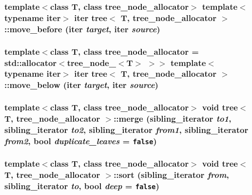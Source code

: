 \hypertarget{classtree_b45aa15042445a81b13873d3ef4a2e86}{
\subsubsection{\setlength{\rightskip}{0pt plus 5cm}template$<$class T, class tree\_\-node\_\-allocator$>$ template$<$typename iter$>$ iter {\bf tree}$<$ T, tree\_\-node\_\-allocator $>$::move\_\-before (iter {\em target}, \/  iter {\em source})}}
\label{classtree_b45aa15042445a81b13873d3ef4a2e86}


\hypertarget{classtree_d9502fe76187e35ef0dcd0a46a39193b}{
\subsubsection{\setlength{\rightskip}{0pt plus 5cm}template$<$class T, class tree\_\-node\_\-allocator = std::allocator$<$tree\_\-node\_\-$<$T$>$ $>$$>$ template$<$typename iter$>$ iter {\bf tree}$<$ T, tree\_\-node\_\-allocator $>$::move\_\-below (iter {\em target}, \/  iter {\em source})}}
\label{classtree_d9502fe76187e35ef0dcd0a46a39193b}


\hypertarget{classtree_1e3cd901f8f8d8a3da0e1d32e9282db1}{
\subsubsection{\setlength{\rightskip}{0pt plus 5cm}template$<$class T, class tree\_\-node\_\-allocator$>$ void {\bf tree}$<$ T, tree\_\-node\_\-allocator $>$::merge ({\bf sibling\_\-iterator} {\em to1}, \/  {\bf sibling\_\-iterator} {\em to2}, \/  {\bf sibling\_\-iterator} {\em from1}, \/  {\bf sibling\_\-iterator} {\em from2}, \/  bool {\em duplicate\_\-leaves} = {\tt false})}}
\label{classtree_1e3cd901f8f8d8a3da0e1d32e9282db1}


\hypertarget{classtree_498ec42a5eb44cba8bf9ef6e7fd5db9e}{
\subsubsection{\setlength{\rightskip}{0pt plus 5cm}template$<$class T, class tree\_\-node\_\-allocator$>$ void {\bf tree}$<$ T, tree\_\-node\_\-allocator $>$::sort ({\bf sibling\_\-iterator} {\em from}, \/  {\bf sibling\_\-iterator} {\em to}, \/  bool {\em deep} = {\tt false})}}
\label{classtree_498ec42a5eb44cba8bf9ef6e7fd5db9e}



